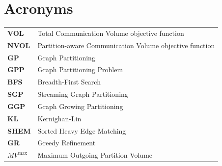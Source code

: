 \documentclass[UKenglish]{uiomasterthesis}
\begin{document}
	\tableofcontents{}                         
	\listoffigures{}                           
	\listoftables{}
	\listofalgorithms{}
	\chapter*{Acronyms}
	\begin{tabular}{@{}ll@{}}
		\textbf{VOL}  & Total Communication Volume objective function\\
		\textbf{NVOL} & Partition-aware Communication Volume objective function\\
		\textbf{GP}   & Graph Partitioning\\
		\textbf{GPP}   & Graph Partitioning Problem\\
		\textbf{BFS}   & Breadth-First Search\\
		\textbf{SGP}   & Streaming Graph Partitioning\\
		\textbf{GGP}   & Graph Growing Partitioning\\
		\textbf{KL}	   & Kernighan-Lin\\
		\textbf{SHEM}  & Sorted Heavy Edge Matching\\
		\textbf{GR}	   & Greedy Refinement\\
		\textbf{$MV^{\mathrm{max}}$}   & Maximum Outgoing Partition Volume\\
	\end{tabular}
	\clearpage          
	\mainmatter{}
	
	
		                             	
	
	
	
	
	                   
	\backmatter{}
	\printbibliography
\end{document}
